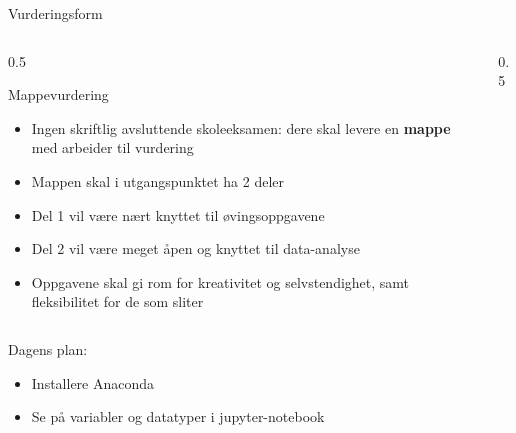 \documentclass[aspectratio=169]{beamer}
\begin{document}
\begin{frame}{Vurderingsform}
  \begin{columns}
    \begin{column}{0.5\textwidth}
      \begin{block}{Mappevurdering}
        \begin{itemize}
          \item {Ingen skriftlig avsluttende skoleeksamen: dere skal levere en \textbf{mappe} med arbeider til vurdering}
          \item {Mappen skal i utgangspunktet ha 2 deler}
          \item {Del 1 vil være nært knyttet til øvingsoppgavene}
          \item {Del 2 vil være meget åpen og knyttet til data-analyse}
          \item {Oppgavene skal gi rom for kreativitet og selvstendighet, samt fleksibilitet for de som sliter}
        \end{itemize}
      \end{block}
    \end{column}
    \begin{column}{0.5\textwidth}
    \end{column}
  \end{columns}
\end{frame}

\begin{frame}{Dagens plan:}
  \begin{itemize}
    \item {Installere Anaconda}
    \item {Se på variabler og datatyper i jupyter-notebook}
  \end{itemize}
\end{frame}

   
\end{document}
